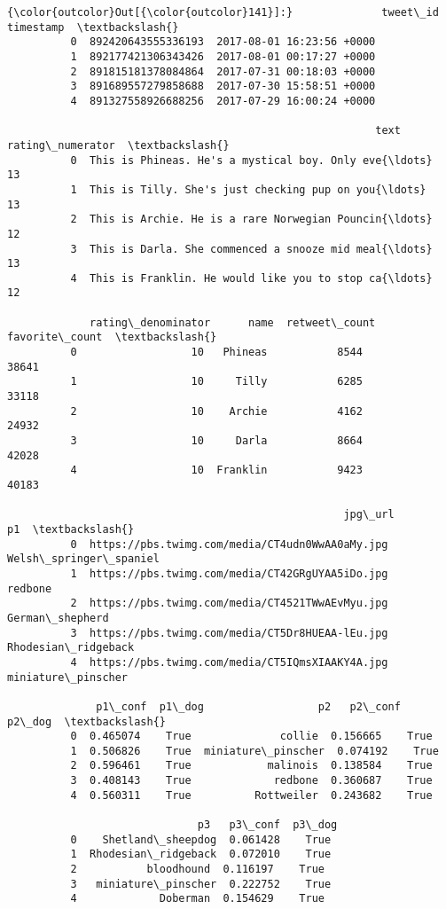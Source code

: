 \documentclass[11pt]{article}
\begin{document}
\begin{Verbatim}[commandchars=\\\{\}]
{\color{outcolor}Out[{\color{outcolor}141}]:}              tweet\_id                  timestamp  \textbackslash{}
          0  892420643555336193  2017-08-01 16:23:56 +0000   
          1  892177421306343426  2017-08-01 00:17:27 +0000   
          2  891815181378084864  2017-07-31 00:18:03 +0000   
          3  891689557279858688  2017-07-30 15:58:51 +0000   
          4  891327558926688256  2017-07-29 16:00:24 +0000   
          
                                                          text  rating\_numerator  \textbackslash{}
          0  This is Phineas. He's a mystical boy. Only eve{\ldots}                13   
          1  This is Tilly. She's just checking pup on you{\ldots}                13   
          2  This is Archie. He is a rare Norwegian Pouncin{\ldots}                12   
          3  This is Darla. She commenced a snooze mid meal{\ldots}                13   
          4  This is Franklin. He would like you to stop ca{\ldots}                12   
          
             rating\_denominator      name  retweet\_count  favorite\_count  \textbackslash{}
          0                  10   Phineas           8544           38641   
          1                  10     Tilly           6285           33118   
          2                  10    Archie           4162           24932   
          3                  10     Darla           8664           42028   
          4                  10  Franklin           9423           40183   
          
                                                     jpg\_url                      p1  \textbackslash{}
          0  https://pbs.twimg.com/media/CT4udn0WwAA0aMy.jpg  Welsh\_springer\_spaniel   
          1  https://pbs.twimg.com/media/CT42GRgUYAA5iDo.jpg                 redbone   
          2  https://pbs.twimg.com/media/CT4521TWwAEvMyu.jpg         German\_shepherd   
          3  https://pbs.twimg.com/media/CT5Dr8HUEAA-lEu.jpg     Rhodesian\_ridgeback   
          4  https://pbs.twimg.com/media/CT5IQmsXIAAKY4A.jpg      miniature\_pinscher   
          
              p1\_conf  p1\_dog                  p2   p2\_conf  p2\_dog  \textbackslash{}
          0  0.465074    True              collie  0.156665    True   
          1  0.506826    True  miniature\_pinscher  0.074192    True   
          2  0.596461    True            malinois  0.138584    True   
          3  0.408143    True             redbone  0.360687    True   
          4  0.560311    True          Rottweiler  0.243682    True   
          
                              p3   p3\_conf  p3\_dog  
          0    Shetland\_sheepdog  0.061428    True  
          1  Rhodesian\_ridgeback  0.072010    True  
          2           bloodhound  0.116197    True  
          3   miniature\_pinscher  0.222752    True  
          4             Doberman  0.154629    True  
\end{Verbatim}
            
\end{document}
